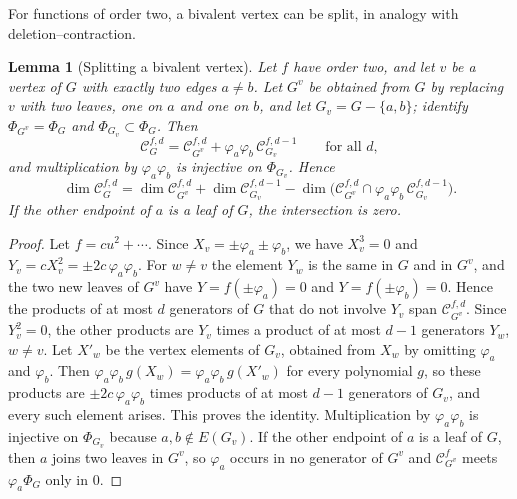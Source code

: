 \documentclass[reqno]{article}
\theoremstyle{plain} %
\newtheorem{lemma}[theorem]{Lemma}
\theoremstyle{definition}
\theoremstyle{remark}
\newcommand {\CC}{\mathscr{C}}
\numberwithin{equation}{section}
\begin{document}
For functions of order two, a bivalent vertex can be split, in analogy
with deletion--contraction.

\begin{lemma}[Splitting a bivalent vertex]\label{lem:split-bivalent}
Let $f$ have order two, and let $v$ be a vertex of $G$ with exactly two
edges $a\ne b$. Let $G^v$ be obtained from $G$ by replacing $v$ with two
leaves, one on $a$ and one on $b$, and let $G_v=G-\{a,b\}$; identify
$\Phi_{G^v}=\Phi_G$ and $\Phi_{G_v}\subset\Phi_G$. Then
\[
 \CC_G^{f,d}=\CC_{G^v}^{f,d}+\varphi_a\varphi_b\,\CC_{G_v}^{f,d-1}
 \qquad\text{for all }d,
\]
and multiplication by $\varphi_a\varphi_b$ is injective on $\Phi_{G_v}$.
Hence
\[
 \dim\CC_G^{f,d}=\dim\CC_{G^v}^{f,d}+\dim\CC_{G_v}^{f,d-1}
 -\dim\bigl(\CC_{G^v}^{f,d}\cap\varphi_a\varphi_b\,\CC_{G_v}^{f,d-1}\bigr).
\]
If the other endpoint of $a$ is a leaf of $G$, the intersection is zero.
\end{lemma}
\begin{proof}
Let $f=cu^2+\cdots$. Since $X_v=\pm\varphi_a\pm\varphi_b$, we have
$X_v^3=0$ and $Y_v=cX_v^2=\pm2c\,\varphi_a\varphi_b$. For $w\ne v$ the
element $Y_w$ is the same in $G$ and in $G^v$, and the two new leaves of
$G^v$ have $Y=f(\pm\varphi_a)=0$ and $Y=f(\pm\varphi_b)=0$. Hence the
products of at most $d$ generators of $G$ that do not involve $Y_v$ span
$\CC_{G^v}^{f,d}$. Since $Y_v^2=0$, the other products are $Y_v$ times a
product of at most $d-1$ generators $Y_w$, $w\ne v$. Let $X'_w$ be the
vertex elements of $G_v$, obtained from $X_w$ by omitting $\varphi_a$ and
$\varphi_b$. Then $\varphi_a\varphi_b\,g(X_w)=\varphi_a\varphi_b\,g(X'_w)$
for every polynomial $g$, so these products are $\pm2c\,\varphi_a\varphi_b$
times products of at most $d-1$ generators of $G_v$, and every such
element arises. This proves the identity. Multiplication by
$\varphi_a\varphi_b$ is injective on $\Phi_{G_v}$ because $a,b\notin
E(G_v)$. If the other endpoint of $a$ is a leaf of $G$, then $a$ joins
two leaves in $G^v$, so $\varphi_a$ occurs in no generator of $G^v$ and
$\CC_{G^v}^f$ meets $\varphi_a\Phi_G$ only in $0$.
\end{proof}
\end{document}
